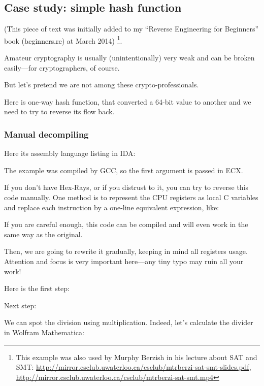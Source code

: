 \subsection{Case study: simple hash function}

(This piece of text was initially added to my ``Reverse Engineering for Beginners'' book (\url{beginners.re}) at March 2014)
\footnote{This example was also used by Murphy Berzish in his lecture about \ac{SAT} and \ac{SMT}:
\url{http://mirror.csclub.uwaterloo.ca/csclub/mtrberzi-sat-smt-slides.pdf},
\url{http://mirror.csclub.uwaterloo.ca/csclub/mtrberzi-sat-smt.mp4}}.

Amateur cryptography is usually (unintentionally) 
very weak and can be broken easily---for cryptographers, of course.

But let's pretend we are not among these crypto-professionals.

Here is one-way hash function, that converted a 64-bit value to another and we need to try to reverse its flow back.

\subsubsection{Manual decompiling}

Here its assembly language listing in IDA:



The example was compiled by GCC, so the first argument is passed in ECX.

If you don't have Hex-Rays, or if you distrust to it, you can try to reverse this code manually.
One method is to represent the CPU registers as local C variables and replace each instruction by a one-line equivalent expression, like:



If you are careful enough, this code can be compiled and will even work in the same way as the original.

Then, we are going to rewrite it gradually, keeping in mind all registers usage.
Attention and focus is very important here---any tiny typo may ruin all your work!

Here is the first step:



Next step:



We can spot the division using multiplication.
Indeed, let's calculate the divider in Wolfram Mathematica:

